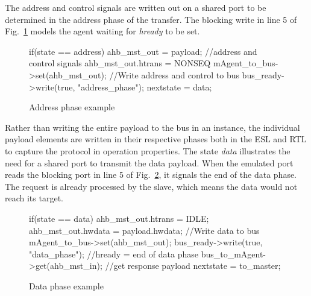 The address and control signals are written out on a shared port to be determined in the address phase of the transfer. The blocking write in line 5 of Fig.~\ref{fig:address-phase} models the agent waiting for \textit{hready} to be set. 

\begin{figure}[hbt] 
\begin{C++}
if(state == address){
  ahb_mst_out = payload; //address and control signals
  ahb_mst_out.htrans = NONSEQ
  mAgent_to_bus->set(ahb_mst_out); //Write address and control to bus
  bus_ready->write(true, "address_phase");
  nextstate = data;
}
\end{C++}
\caption{Address phase example}
\label{fig:address-phase}
\end{figure}

Rather than writing the entire payload to the bus in an instance, the individual payload elements are written in their respective phases both in the ESL and RTL to capture the protocol in operation properties. The state \textit{data} illustrates the need for a shared port to transmit the data payload. When the emulated port reads the blocking port in line 5 of Fig.~\ref{data-phase}, it signals the end of the data phase. The request is already processed by the slave, which means the data would not reach its target.
\newpage
\begin{figure}[h!]
\begin{C++}
if(state == data){
 ahb_mst_out.htrans = IDLE; 
 ahb_mst_out.hwdata = payload.hwdata; //Write data to bus
 mAgent_to_bus->set(ahb_mst_out); 
 bus_ready->write(true, "data_phase"); //hready = end of data phase
 bus_to_mAgent->get(ahb_mst_in); //get response payload
 nextstate = to_master;
}
\end{C++}
\caption{Data phase example}
\label{data-phase}
\end{figure}


 
